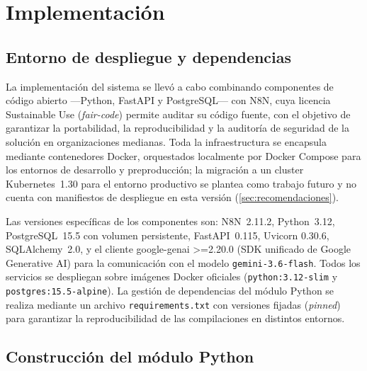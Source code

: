 \section{Implementación}\label{sec:implementacion}

\subsection{Entorno de despliegue y dependencias}\label{subsec:entorno-despliegue}

La implementación del sistema se llevó a cabo combinando componentes de código abierto ---Python, FastAPI y PostgreSQL--- con N8N, cuya licencia Sustainable Use (\emph{fair-code}) permite auditar su código fuente, con el objetivo de garantizar la portabilidad, la reproducibilidad y la auditoría de seguridad de la solución en organizaciones medianas. Toda la infraestructura se encapsula mediante contenedores Docker, orquestados localmente por Docker Compose para los entornos de desarrollo y preproducción; la migración a un cluster Kubernetes~1.30 para el entorno productivo se plantea como trabajo futuro y no cuenta con manifiestos de despliegue en esta versión (\autoref{sec:recomendaciones}).

Las versiones específicas de los componentes son: N8N~2.11.2, Python~3.12, PostgreSQL~15.5 con volumen persistente, FastAPI~0.115, Uvicorn 0.30.6, SQLAlchemy~2.0, y el cliente google-genai >=2.20.0 (SDK unificado de Google Generative AI) para la comunicación con el modelo \texttt{gemini-3.6-flash}. Todos los servicios se despliegan sobre imágenes Docker oficiales (\texttt{python:3.12-slim} y \texttt{postgres:15.5-alpine}). La gestión de dependencias del módulo Python se realiza mediante un archivo \texttt{requirements.txt} con versiones fijadas (\emph{pinned}) para garantizar la reproducibilidad de las compilaciones en distintos entornos.

\subsection{Construcción del módulo Python}\label{subsec:construccion-modulo-python}

